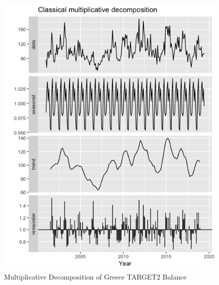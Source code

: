 \documentclass[12pt]{article}
\begin{document}
\begin{figure}[!tbp]
\begin{minipage}[b]{0.49\textwidth}
    \includegraphics[width=\textwidth]{Multiplicative.png}
    \caption{Multiplicative Decomposition of Greece TARGET2 Balance}
  \end{minipage}
\end{figure}
\end{document}
